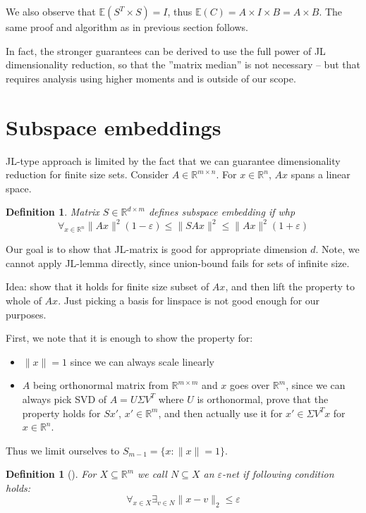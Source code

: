 \documentclass[11pt]{article}
\newtheorem{definition}[theorem]{Definition}
\newcommand{\E}{{\mathbb E}}
\begin{document}
We also observe that $\E(S^T \times S) = I$, thus $\E(C) = A \times I \times B = A \times B$. The same proof and algorithm as in previous section follows.

In fact, the stronger guarantees can be derived to use the full power of JL dimensionality reduction, so that the ''matrix median'' is not necessary -- but that requires analysis using higher moments and is outside of our scope.

\section{Subspace embeddings}
JL-type approach is limited by the fact that we can guarantee dimensionality reduction for finite size sets. 
Consider $A \in \mathbb{R}^{m \times n}$. For $x \in \mathbb{R}^n$, $Ax$ spans a linear space.
\begin{definition}
Matrix $S \in \mathbb{R}^{d \times m}$ defines \emph{subspace embedding} if whp
$$ \forall_{x \in \mathbb{R}^n} \|Ax\|^2(1-\varepsilon) \le \|SAx\|^2 \le  \|Ax\|^2(1+\varepsilon) $$
\end{definition}

Our goal is to show that JL-matrix is good for appropriate dimension $d$. Note, we cannot apply JL-lemma directly, since union-bound fails for sets of infinite size.

Idea: show that it holds for finite size subset of $Ax$, and then lift the property to whole of $Ax$. Just picking a basis for linspace is not good enough for our purposes.

First, we note that it is enough to show the property for:
\begin{itemize}
\item $\|x\|=1$ since we can always scale linearly
\item $A$ being orthonormal matrix from $\mathbb{R}^{m \times m}$ and $x$ goes over $\mathbb{R}^m$, since we can always pick SVD of $A = U \Sigma V^T$ where $U$ is orthonormal, prove that the property holds for $Sx'$, $x' \in \mathbb{R}^m$, and then actually use it for $x' \in \Sigma V^T x$ for $x \in \mathbb{R}^n$.
\end{itemize}

Thus we limit ourselves to $S_{m-1} = \{x : \|x\| = 1\}$.

\begin{definition}[\cite{10.5555/581165}]
For $X \subseteq \mathbb{R}^m$ we call $N \subseteq X$ an $\varepsilon$-net if following condition holds:
$$\forall_{x \in X} \exists_{v \in N} \|x-v\|_2 \le \varepsilon$$
\end{definition}
\end{document}
